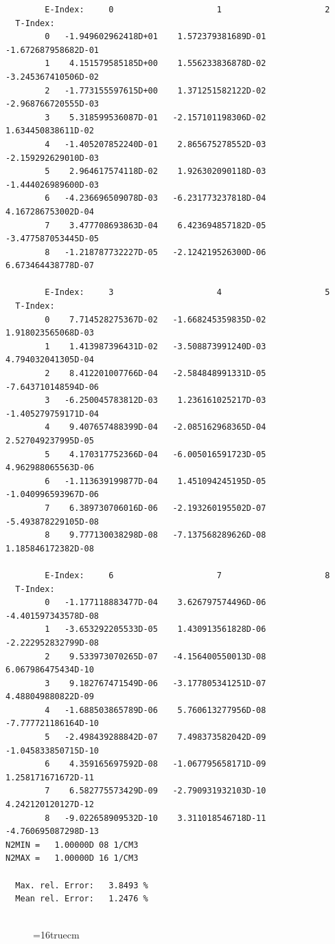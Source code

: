 \documentclass[12pt,dvipdfmx]{article}
\begin{document}
\begin{small}\begin{verbatim}
        E-Index:     0                     1                     2
  T-Index:
        0   -1.949602962418D+01    1.572379381689D-01   -1.672687958682D-01
        1    4.151579585185D+00    1.556233836878D-02   -3.245367410506D-02
        2   -1.773155597615D+00    1.371251582122D-02   -2.968766720555D-03
        3    5.318599536087D-01   -2.157101198306D-02    1.634450838611D-02
        4   -1.405207852240D-01    2.865675278552D-03   -2.159292629010D-03
        5    2.964617574118D-02    1.926302090118D-03   -1.444026989600D-03
        6   -4.236696509078D-03   -6.231773237818D-04    4.167286753002D-04
        7    3.477708693863D-04    6.423694857182D-05   -3.477587053445D-05
        8   -1.218787732227D-05   -2.124219526300D-06    6.673464438778D-07

        E-Index:     3                     4                     5
  T-Index:
        0    7.714528275367D-02   -1.668245359835D-02    1.918023565068D-03
        1    1.413987396431D-02   -3.508873991240D-03    4.794032041305D-04
        2    8.412201007766D-04   -2.584848991331D-05   -7.643710148594D-06
        3   -6.250045783812D-03    1.236161025217D-03   -1.405279759171D-04
        4    9.407657488399D-04   -2.085162968365D-04    2.527049237995D-05
        5    4.170317752366D-04   -6.005016591723D-05    4.962988065563D-06
        6   -1.113639199877D-04    1.451094245195D-05   -1.040996593967D-06
        7    6.389730706016D-06   -2.193260195502D-07   -5.493878229105D-08
        8    9.777130038298D-08   -7.137568289626D-08    1.185846172382D-08

        E-Index:     6                     7                     8
  T-Index:
        0   -1.177118883477D-04    3.626797574496D-06   -4.401597343578D-08
        1   -3.653292205533D-05    1.430913561828D-06   -2.222952832799D-08
        2    9.533973070265D-07   -4.156400550013D-08    6.067986475434D-10
        3    9.182767471549D-06   -3.177805341251D-07    4.488049880822D-09
        4   -1.688503865789D-06    5.760613277956D-08   -7.777721186164D-10
        5   -2.498439288842D-07    7.498373582042D-09   -1.045833850715D-10
        6    4.359165697592D-08   -1.067795658171D-09    1.258171671672D-11
        7    6.582775573429D-09   -2.790931932103D-10    4.242120120127D-12
        8   -9.022658909532D-10    3.311018546718D-11   -4.760695087298D-13
N2MIN =   1.00000D 08 1/CM3
N2MAX =   1.00000D 16 1/CM3

  Max. rel. Error:   3.8493 %
  Mean rel. Error:   1.2476 %


\end{verbatim}\end{small}
\begin{figure} \label{2.1.5e}
\epsfxsize=16truecm
\end{figure}
\newpage
\end{document}
